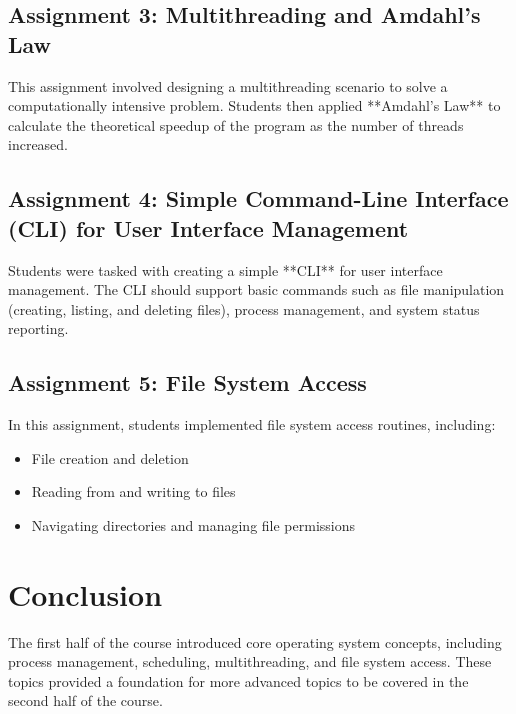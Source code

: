 \documentclass[12pt]{article}
\begin{document}
\begin{table}[htbp]
    \centering %
    \caption{Table Algoritma sAfety} %
    \label{tab:tabel2} 
\end{table}

\subsection{Assignment 3: Multithreading and Amdahl's Law}
This assignment involved designing a multithreading scenario to solve a computationally intensive problem. Students then applied **Amdahl's Law** to calculate the theoretical speedup of the program as the number of threads increased.

\subsection{Assignment 4: Simple Command-Line Interface (CLI) for User Interface Management}
Students were tasked with creating a simple **CLI** for user interface management. The CLI should support basic commands such as file manipulation (creating, listing, and deleting files), process management, and system status reporting.

\subsection{Assignment 5: File System Access}
In this assignment, students implemented file system access routines, including:
\begin{itemize}
    \item File creation and deletion
    \item Reading from and writing to files
    \item Navigating directories and managing file permissions
\end{itemize}

\section{Conclusion}
The first half of the course introduced core operating system concepts, including process management, scheduling, multithreading, and file system access. These topics provided a foundation for more advanced topics to be covered in the second half of the course.
\end{document}
